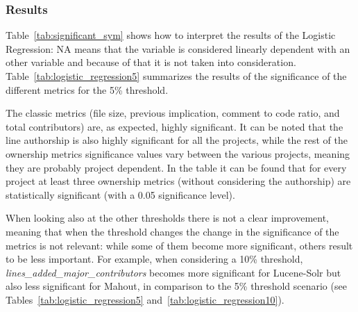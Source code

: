 \subsubsection{Results}

Table~\ref{tab:significant_sym} shows how to interpret the results of the Logistic Regression:  NA means that the variable is considered linearly dependent with an other variable and because of that it is not taken into consideration. Table~\ref{tab:logistic_regression5} summarizes the results of the significance of the different metrics for the 5\% threshold.

The classic metrics (file size, previous implication, comment to code ratio, and total contributors) are, as expected, highly significant. It can be noted that the line authorship is also highly significant for all the projects, while the rest of the ownership metrics significance values vary between the various projects, meaning they are probably project dependent. In the table it can be found that for every project at least three ownership metrics (without considering the authorship) are statistically significant (with a 0.05 significance level).   

When looking also at the other thresholds there is not a clear improvement, meaning that when the threshold changes the change in the significance of the metrics is not relevant: while some of them become more significant, others result to be less important. For example, when considering a 10\% threshold, \textit{lines\_added\_major\_contributors} becomes more significant for Lucene-Solr but also less significant for Mahout, in comparison to the 5\% threshold scenario (see Tables~\ref{tab:logistic_regression5} and~\ref{tab:logistic_regression10}).


